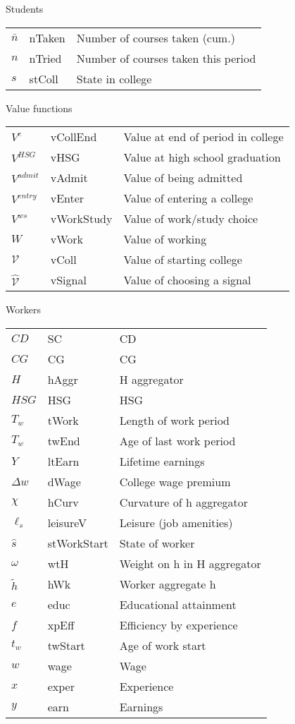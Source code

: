 Students

\begin{tabular}{lll}
\hline
$\bar{n}$ & nTaken & Number of courses taken (cum.)\tabularnewline
$n$ & nTried & Number of courses taken this period\tabularnewline
$s$ & stColl & State in college\tabularnewline
\hline
\end{tabular}
 
Value functions

\begin{tabular}{lll}
\hline
$V^e$ & vCollEnd & Value at end of period in college\tabularnewline
$V^{HSG}$ & vHSG & Value at high school graduation\tabularnewline
$V^{admit}$ & vAdmit & Value of being admitted\tabularnewline
$V^{entry}$ & vEnter & Value of entering a college\tabularnewline
$V^{ws}$ & vWorkStudy & Value of work/study choice\tabularnewline
$W$ & vWork & Value of working\tabularnewline
$\mathcal{V}$ & vColl & Value of starting college\tabularnewline
$\mathcal{\hat{V}}$ & vSignal & Value of choosing a signal\tabularnewline
\hline
\end{tabular}
 
Workers

\begin{tabular}{lll}
\hline
$CD$ & SC & CD\tabularnewline
$CG$ & CG & CG\tabularnewline
$H$ & hAggr & H aggregator\tabularnewline
$HSG$ & HSG & HSG\tabularnewline
$T_w$ & tWork & Length of work period\tabularnewline
$T_{w}$ & twEnd & Age of last work period\tabularnewline
$Y$ & ltEarn & Lifetime earnings\tabularnewline
$\Delta w$ & dWage & College wage premium\tabularnewline
$\chi$ & hCurv & Curvature of h aggregator\tabularnewline
$\ell_{s}$ & leisureV & Leisure (job amenities) \tabularnewline
$\hat{s}$ & stWorkStart & State of worker\tabularnewline
$\omega$ & wtH & Weight on h in H aggregator\tabularnewline
$\tilde{h}$ & hWk & Worker aggregate h\tabularnewline
$e$ & educ & Educational attainment\tabularnewline
$f$ & xpEff & Efficiency by experience\tabularnewline
$t_{w}$ & twStart & Age of work start\tabularnewline
$w$ & wage & Wage\tabularnewline
$x$ & exper & Experience\tabularnewline
$y$ & earn & Earnings\tabularnewline
\hline
\end{tabular}
 
